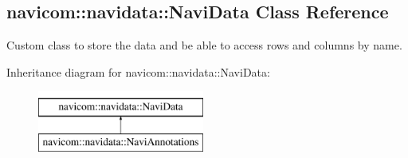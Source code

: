 \hypertarget{classnavicom_1_1navidata_1_1NaviData}{
\subsection{navicom::navidata::NaviData Class Reference}
\label{classnavicom_1_1navidata_1_1NaviData}
}


Custom class to store the data and be able to access rows and columns by name.  


Inheritance diagram for navicom::navidata::NaviData:\begin{figure}[H]
\begin{center}
\leavevmode
\includegraphics[height=2.000000cm]{classnavicom_1_1navidata_1_1NaviData}
\end{center}
\end{figure}
